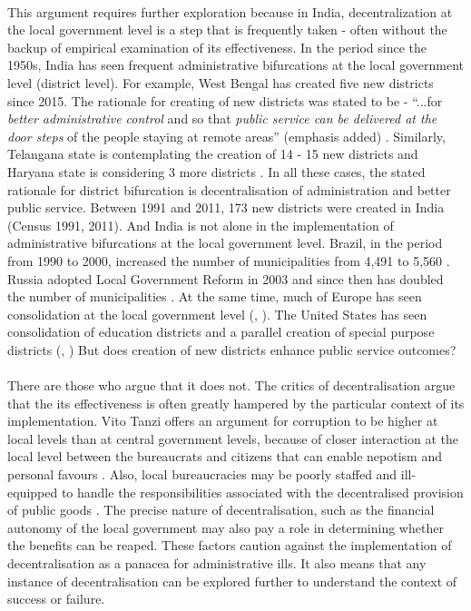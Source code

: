 \documentclass[12pt, a4paper]{article}
\begin{document}
\paragraph{} This argument requires further exploration because in India, decentralization at the local government level is a step that is frequently taken - often without the backup of empirical examination of its effectiveness. In the period since the 1950s, India has seen frequent administrative bifurcations at the local government level (district level). For example, West Bengal has created five new districts since 2015. The rationale for creating of new districts was stated to be - ``...for \textit{better administrative control} and so that \textit{public service can be delivered at the door steps} of the people staying at remote areas'' (emphasis added) \parencite{Mamata}. Similarly, Telangana state is contemplating the creation of 14 - 15 new districts \parencite{Telengana} and Haryana state is considering 3 more districts \parencite{Haryana}. In all these cases, the stated rationale for district bifurcation is decentralisation of administration and better public service. Between 1991 and 2011, 173 new districts were created in India (Census 1991, 2011). And India is not alone in the implementation of administrative bifurcations at the local government level. Brazil, in the period from 1990 to 2000, increased the number of municipalities from 4,491 to 5,560 \parencite{tomio2005creation}. Russia adopted Local Government Reform in 2003 and since then has doubled the number of municipalities \parencite{turgel2008new}. At the same time, much of Europe has seen consolidation at the local government level (\cite{mouritzen_danish_2010}, \cite{bikker_scale_2016}). The United States has seen consolidation of education districts and a parallel creation of special purpose districts (\cite{strang1987administrative}, \cite{mccabe2000special}) But does creation of new districts enhance public service outcomes?
\paragraph{}There are those who argue that it does not. The critics of decentralisation argue that the its effectiveness is often greatly hampered by the particular context of its implementation. Vito Tanzi offers an argument for corruption to be higher at local levels than at central government levels, because of closer interaction at the local level between the bureaucrats and citizens that can enable nepotism and personal favours \parencite{tanzi1996macroeconomic}. Also, local bureaucracies may be poorly staffed and ill-equipped to handle the responsibilities associated with the decentralised provision of public goods \parencite{prud1995dangers}. The precise nature of decentralisation, such as the financial autonomy of the local government may also pay a role in determining whether the benefits can be reaped. These factors caution against the implementation of decentralisation as a panacea for administrative ills. It also means that any instance of decentralisation can be explored further to understand the context of success or failure.
\end{document}
